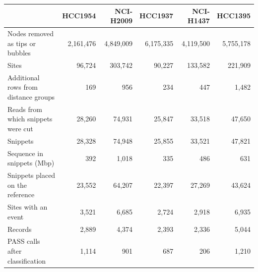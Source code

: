 \begin{tabular}{lrrrrr}
\toprule
 & HCC1954 & NCI-H2009 & HCC1937 & NCI-H1437 & HCC1395 \\
\midrule
Nodes removed as tips or bubbles & 2,161,476 & 4,849,009 & 6,175,335 & 4,119,500 & 5,755,178 \\
Sites & 96,724 & 303,742 & 90,227 & 133,582 & 221,909 \\
Additional rows from distance groups & 169 & 956 & 234 & 447 & 1,482 \\
Reads from which snippets were cut & 28,260 & 74,931 & 25,847 & 33,518 & 47,650 \\
Snippets & 28,328 & 74,948 & 25,855 & 33,521 & 47,821 \\
Sequence in snippets (Mbp) & 392 & 1,018 & 335 & 486 & 631 \\
Snippets placed on the reference & 23,552 & 64,207 & 22,397 & 27,269 & 43,624 \\
Sites with an event & 3,521 & 6,685 & 2,724 & 2,918 & 6,935 \\
Records & 2,889 & 4,374 & 2,393 & 2,336 & 5,044 \\
PASS calls after classification & 1,114 & 901 & 687 & 206 & 1,210 \\
\bottomrule
\end{tabular}
